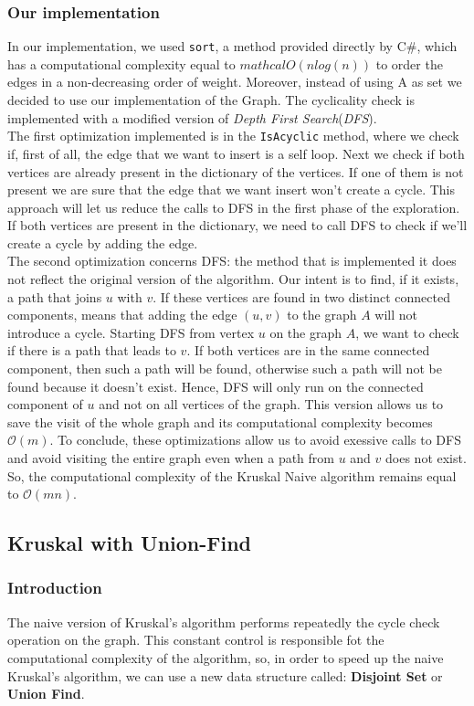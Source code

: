 \subsubsection{Our implementation}
In our implementation, we used \verb|sort|, a method provided directly by C\#, which has a computational complexity equal to $mathcal{O}(n log(n))$ to order the edges in a non-decreasing order of weight.
Moreover, instead of using A as set we decided to use our implementation of the Graph.
The cyclicality check is implemented with a modified version of \textit{Depth First Search}(\textit{DFS}).\\
The first optimization implemented is in the \verb|IsAcyclic| method, where we check if, first of all, the edge that we want 
to insert is a self loop. Next we check if both vertices are already present in the dictionary of the vertices.
If one of them is not present we are sure that the edge that we want insert won't create a cycle.
This approach will let us reduce the calls to DFS in the first phase of the exploration.
If both vertices are present in the dictionary, we need to call DFS to check if we'll create a cycle by adding the edge.\\
The second optimization concerns DFS: the method that is implemented it does not reflect the original version 
of the algorithm. Our intent is to find, if it exists, a path that joins $u$ with $v$. If these vertices are found 
in two distinct connected components, means that adding the edge $(u, v)$ to the graph $A$ will not introduce a cycle. 
Starting DFS from vertex $u$ on the graph $A$, we want to check if there is a path that leads to $v$.
If both vertices are in the same connected component, then such a path will be found, otherwise such a path will 
not be found because it doesn't exist. Hence, DFS will only run on the connected component of $u$ and not on all 
vertices of the graph. This version allows us to save the visit of the whole graph and its computational complexity 
becomes $\mathcal{O}(m)$. To conclude, these optimizations allow us to avoid exessive calls to DFS and avoid visiting the entire
graph even when a path from $u$ and $v$ does not exist. So, the computational complexity of the Kruskal Naive algorithm remains equal to $\mathcal{O}(mn)$.

\subsection{Kruskal with Union-Find}

\subsubsection{Introduction}
The naive version of Kruskal's algorithm performs repeatedly the cycle check operation on the graph. 
This constant control is responsible fot the computational complexity of the algorithm, so, in order to speed up the 
naive Kruskal's algorithm, we can use a new data structure called: \textbf{Disjoint Set} or \textbf{Union Find}.\\

